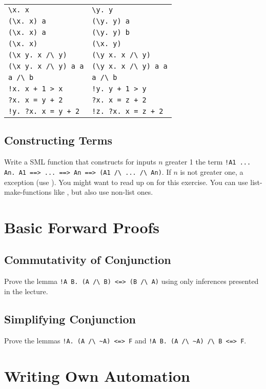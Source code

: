\documentclass[a4paper,10pt,oneside]{scrartcl}
\begin{document}
\begin{tabular}{@{$\ \ \bullet\ \ $}ll}
\verb#\x. x# & \verb#\y. y# \\
\verb#(\x. x) a# & \verb#(\y. y) a# \\
\verb#(\x. x) a# & \verb#(\y. y) b# \\
\verb#(\x. x)# & \verb#(\x. y)# \\
\verb#(\x y. x /\ y)# & \verb#(\y x. x /\ y)# \\
\verb#(\x y. x /\ y) a a# & \verb#(\y x. x /\ y) a a# \\
\verb#a /\ b# & \verb#a /\ b# \\
\verb#!x. x + 1 > x# & \verb#!y. y + 1 > y# \\
\verb#?x. x = y + 2# & \verb#?x. x = z + 2# \\
\verb#!y. ?x. x = y + 2# & \verb#!z. ?x. x = z + 2# \\
\end{tabular}

\subsection{Constructing Terms}

Write a SML function  that constructs for inputs $n$ greater 1 the term \verb#!A1 ... An. A1 ==> ... ==> An ==> (A1 /\ ... /\ An)#. If $n$ is not greater one, a  exception (use ). You might want to read up on  for this exercise. You can use list-make-functions like , but also use non-list ones. 


\section{Basic Forward Proofs}

\subsection{Commutativity of Conjunction}
Prove the lemma \verb#!A B. (A /\ B) <=> (B /\ A)# using only inferences presented in the lecture.

\subsection{Simplifying Conjunction}
Prove the lemmas \verb#!A. (A /\ ~A) <=> F# and \verb#!A B. (A /\ ~A) /\ B <=> F#.


\section{Writing Own Automation}
\end{document}
